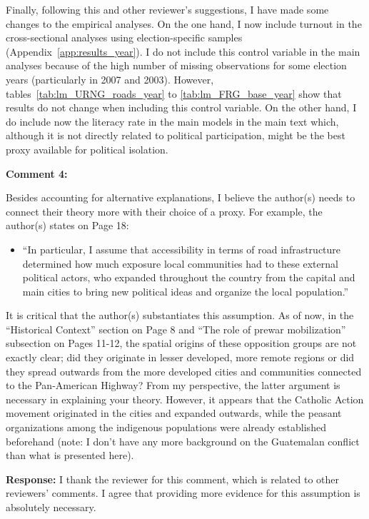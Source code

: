 \documentclass[12pt, a4paper, notitlepage]{article}
\begin{document}
Finally, following this and other reviewer's suggestions, I have made some changes to the empirical analyses. On the one hand, I now include turnout in the cross-sectional analyses using election-specific samples (Appendix~\ref{app:results_year}). I do not include this control variable in the main analyses because of the high number of missing observations for some election years (particularly in 2007 and 2003). However, tables~\ref{tab:lm_URNG_roads_year} to \ref{tab:lm_FRG_base_year} show that results do not change when including this control variable.
On the other hand, I do include now the literacy rate in the main models in the main text which, although it is not directly related to political participation, might be the best proxy available for political isolation.

\vspace{15pt}
\noindent\textbf{Comment 4:}
\begin{displayquote}
Besides accounting for alternative explanations, I believe the author(s) needs to connect their theory more with their choice of a proxy. For example, the author(s) states on Page 18:
\begin{itemize}
  \item[] ``In particular, I assume that accessibility in terms of road infrastructure determined how much exposure local communities had to these external political actors, who expanded throughout the country from the capital and main cities to bring new political ideas and organize the local population.''
\end{itemize}
It is critical that the author(s) substantiates this assumption. As of now, in the “Historical Context” section on Page 8 and “The role of prewar mobilization” subsection on Pages 11-12, the spatial origins of these opposition groups are not exactly clear; did they originate in lesser developed, more remote regions or did they spread outwards from the more developed cities and communities connected to the Pan-American Highway? From my perspective, the latter argument is necessary in explaining your theory. However, it appears that the Catholic Action movement originated in the cities and expanded outwards, while the peasant organizations among the indigenous populations were already established beforehand (note: I don’t have any more background on the Guatemalan conflict than what is presented here).
\end{displayquote}

\noindent\textbf{Response:} I thank the reviewer for this comment, which is related to other reviewers' comments. I agree that providing more evidence for this assumption is absolutely necessary.
\end{document}
